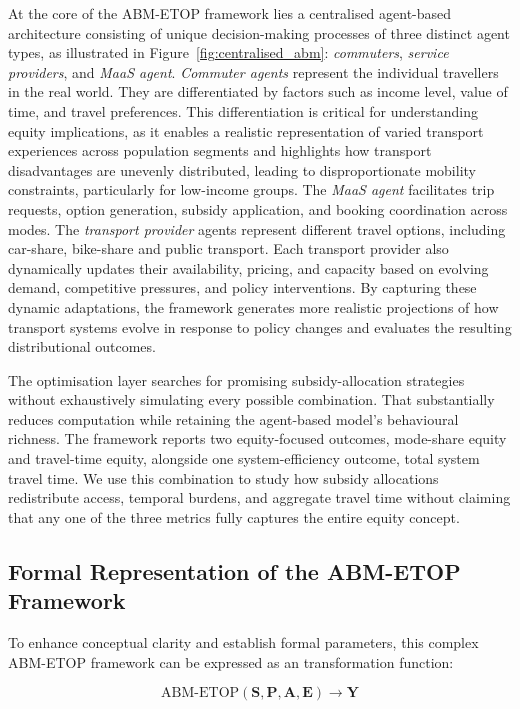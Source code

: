 \documentclass[a4paper,fleqn]{cas-sc}
\begin{document}
At the core of the ABM-ETOP framework lies a centralised agent-based architecture consisting of unique decision-making processes of three distinct agent types, as illustrated in Figure~\ref{fig:centralised_abm}: \textit{commuters}, \textit{service providers}, and \textit{MaaS agent}. \textit{Commuter agents} represent the individual travellers in the real world. They are differentiated by factors such as income level, value of time, and travel preferences. This differentiation is critical for understanding equity implications, as it enables a realistic representation of varied transport experiences across population segments and highlights how transport disadvantages are unevenly distributed, leading to disproportionate mobility constraints, particularly for low-income groups. The  \textit{MaaS agent} facilitates trip requests, option generation, subsidy application, and booking coordination across modes. The \textit{transport provider} agents represent different travel options, including car-share, bike-share and public transport. Each transport provider also dynamically updates their availability, pricing, and capacity based on evolving demand, competitive pressures, and policy interventions. By capturing these dynamic adaptations, the framework generates more realistic projections of how transport systems evolve in response to policy changes and evaluates the resulting distributional outcomes.

The optimisation layer searches for promising subsidy-allocation strategies without exhaustively simulating every possible combination. That substantially reduces computation while retaining the agent-based model's behavioural richness. The framework reports two equity-focused outcomes, mode-share equity and travel-time equity, alongside one system-efficiency outcome, total system travel time. We use this combination to study how subsidy allocations redistribute access, temporal burdens, and aggregate travel time without claiming that any one of the three metrics fully captures the entire equity concept.

\subsection{Formal Representation of the ABM-ETOP Framework}\label{sec:simpleformula}

To enhance conceptual clarity and establish formal parameters, this complex ABM-ETOP framework can be expressed as an transformation function:

\begin{equation}
\text{ABM-ETOP}(\mathbf{S}, \mathbf{P}, \mathbf{A}, \mathbf{E}) \rightarrow \mathbf{Y}
\end{equation}
\end{document}
